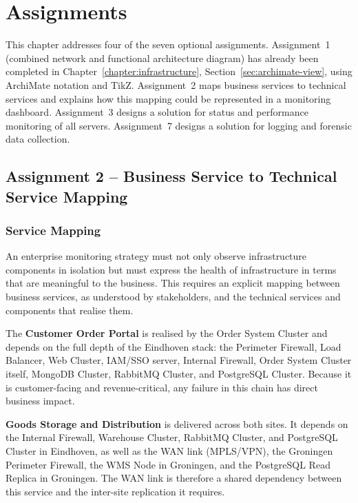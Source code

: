 \chapter{Assignments}
\label{chapter:assignments}

This chapter addresses four of the seven optional assignments. Assignment~1 (combined network and functional architecture diagram) has already been completed in Chapter~\ref{chapter:infrastructure}, Section~\ref{sec:archimate-view}, using ArchiMate notation and TikZ. Assignment~2 maps business services to technical services and explains how this mapping could be represented in a monitoring dashboard. Assignment~3 designs a solution for status and performance monitoring of all servers. Assignment~7 designs a solution for logging and forensic data collection.

\section{Assignment 2 -- Business Service to Technical Service Mapping}
\label{sec:assignment2}

\subsection{Service Mapping}

An enterprise monitoring strategy must not only observe infrastructure components in isolation but must express the health of infrastructure in terms that are meaningful to the business. \label{tab:service-mapping}This requires an explicit mapping between business services, as understood by stakeholders, and the technical services and components that realise them.

The \textbf{Customer Order Portal} is realised by the Order System Cluster and depends on the full depth of the Eindhoven stack: the Perimeter Firewall, Load Balancer, Web Cluster, IAM/SSO server, Internal Firewall, Order System Cluster itself, MongoDB Cluster, RabbitMQ Cluster, and PostgreSQL Cluster. Because it is customer-facing and revenue-critical, any failure in this chain has direct business impact.

\textbf{Goods Storage and Distribution} is delivered across both sites. It depends on the Internal Firewall, Warehouse Cluster, RabbitMQ Cluster, and PostgreSQL Cluster in Eindhoven, as well as the WAN link (MPLS/VPN), the Groningen Perimeter Firewall, the WMS Node in Groningen, and the PostgreSQL Read Replica in Groningen. The WAN link is therefore a shared dependency between this service and the inter-site replication it requires.

